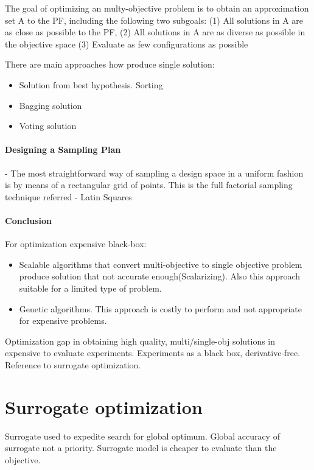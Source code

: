             The goal of optimizing an multy-objective problem is to obtain an approximation set A to the PF, including the following two subgoals:
                (1) All solutions in A are as close as possible to the PF,
                (2) All solutions in A are as diverse as possible in the objective space
                (3) Evaluate as few configurations as possible
        
            There are main approaches how produce single solution: 
            \begin{itemize}
                \item Solution from best hypothesis. Sorting
                \item Bagging solution
                \item Voting solution                
            \end{itemize}
        
            \paragraph{Designing a Sampling Plan}
             - The most straightforward way of sampling a design space in a uniform fashion is by \cite{EngSurMod}
             means of a rectangular grid of points. This is the full factorial sampling technique referred
             - Latin Squares

        \paragraph{Conclusion}
        For optimization expensive black-box:
        \begin{itemize}
            \item Scalable algorithms that convert multi-objective to single objective problem produce solution that not accurate enough(Scalarizing). Also this approach suitable for a limited type of problem.
            \item Genetic algorithms. This approach is costly to perform and not appropriate for expensive problems.
        \end{itemize}
        Optimization gap in obtaining high quality, multi/single-obj solutions in expensive to evaluate experiments.
        Experiments as a black box, derivative-free. Reference to surrogate optimization.

    \section{Surrogate optimization}
        Surrogate used to expedite search for global optimum. Global accuracy of surrogate
        not a priority. Surrogate model is cheaper to evaluate than the objective.

